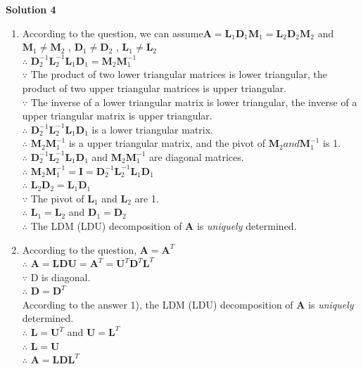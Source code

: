 \documentclass[english,onecolumn]{IEEEtran}
\begin{document}
\noindent\textbf{Solution 4}
\begin{enumerate}
    	\item 
    	According to the question, we can assume$\mathbf{A}=\mathbf{L}_{1}\mathbf{D}_{1}\mathbf{M}_{1}=\mathbf{L}_{2}\mathbf{D}_{2}\mathbf{M}_{2}$ and $\mathbf{M}_{1}\ne \mathbf{M}_{2}$ , $\mathbf{D}_{1}\ne \mathbf{D}_{2}$ , $\mathbf{L}_{1}\ne \mathbf{L}_{2}$\\
    	$\therefore$ $\mathbf{D}_{2}^{-1}\mathbf{L}_{2}^{-1}\mathbf{L}_{1}\mathbf{D}_{1}=\mathbf{M}_{2}\mathbf{M}_{1}^{-1}$\\
    	$\because$ The product of two lower triangular matrices is lower triangular, the product of two upper triangular matrices is upper triangular.\\
    	$\because$ The inverse of a lower triangular matrix is lower triangular, the inverse of a upper triangular matrix is upper triangular.\\
    	$\therefore$ $\mathbf{D}_{2}^{-1}\mathbf{L}_{2}^{-1}\mathbf{L}_{1}\mathbf{D}_{1}$ is a lower triangular matrix.\\
    	$\therefore$ $\mathbf{M}_{2}\mathbf{M}_{1}^{-1}$ is a upper triangular matrix, and the pivot of $\mathbf{M}_{2} and \mathbf{M}_{1}^{-1}$ is 1.\\
    	$\therefore$ $\mathbf{D}_{2}^{-1}\mathbf{L}_{2}^{-1}\mathbf{L}_{1}\mathbf{D}_{1}$ and $\mathbf{M}_{2}\mathbf{M}_{1}^{-1}$ are diagonal matrices.\\
    	$\therefore$ $\mathbf{M}_{2}\mathbf{M}_{1}^{-1}=\mathbf{I}=\mathbf{D}_{2}^{-1}\mathbf{L}_{2}^{-1}\mathbf{L}_{1}\mathbf{D}_{1}$\\
    	$\therefore$ $\mathbf{L}_{2}\mathbf{D}_{2}=\mathbf{L}_{1}\mathbf{D}_{1}$\\
    	$\because$ The pivot of $\mathbf{L}_{1}$ and $\mathbf{L}_{2}$ are 1.\\
    	$\therefore$ $\mathbf{L}_{1}=\mathbf{L}_{2}$ and $\mathbf{D}_{1}=\mathbf{D}_{2}$\\
    	$\therefore$ The LDM (LDU) decomposition of $\mathbf{A}$ is \textit{uniquely} determined.
     
    \item 
    	According to the question, $\mathbf{A}=\mathbf{A}^{T}$\\
    	$\therefore$ $\mathbf{A}=\mathbf{L}\mathbf{D}\mathbf{U}=\mathbf{A}^{T}=\mathbf{U}^{T}\mathbf{D}^{T}\mathbf{L}^{T}$\\
    	$\because$ D is diagonal.\\
    	$\therefore$ $\mathbf{D}=\mathbf{D}^{T}$\\
    	According to the answer 1), the LDM (LDU) decomposition of $\mathbf{A}$ is \textit{uniquely} determined.\\
    	$\therefore$ $\mathbf{L}=\mathbf{U}^{T}$ and $\mathbf{U}=\mathbf{L}^{T}$\\
    	$\therefore$ $\mathbf{L}=\mathbf{U}$\\
    	$\therefore$ $\mathbf{A}=\mathbf{L}\mathbf{D}\mathbf{L}^{T}$\\
    	

\end{enumerate}
\end{document}
